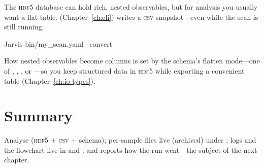 The \textsc{hdf5} database can hold rich, nested observables, but for analysis you usually want a
flat table.  (Chapter~\ref{ch:cli}) writes a \textsc{csv} snapshot---even while the
scan is still running:

\begin{shellbox}
Jarvis bin/my_scan.yaml --convert
\end{shellbox}

\noindent How nested observables become columns is set by the schema's flatten mode---one of
, , , or ---so you keep structured data
in \textsc{hdf5} while exporting a convenient table (Chapter~\ref{ch:io-types}).

\section{Summary}
\label{sec:out-summary}

Analyse  (\textsc{hdf5} $+$ \textsc{csv} $+$ schema); per-sample files live
(archived) under ; logs and the flowchart live in  and ;
and  reports how the run went---the subject of the next chapter.
